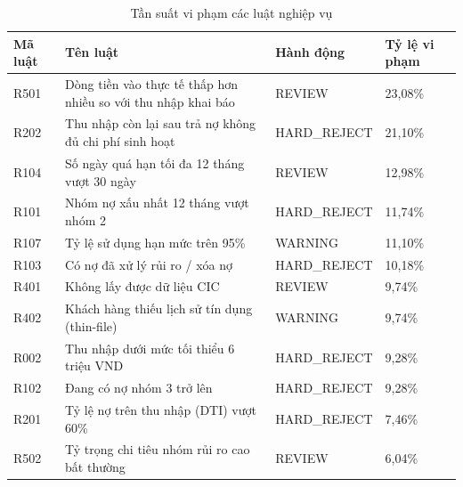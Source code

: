 \begin{table}[!htbp]
\centering
\caption{Tần suất vi phạm các luật nghiệp vụ}
\label{tab:rule-hits}
\small
\setlength{\tabcolsep}{5.0pt}
\begin{tabular}{@{}L{2.8cm}L{6.0cm}L{2.6cm}R{2.6cm}@{}}
\toprule
\textbf{Mã luật} & \textbf{Tên luật} & \textbf{Hành động} & \textbf{Tỷ lệ vi phạm} \\
\midrule
R501 & Dòng tiền vào thực tế thấp hơn nhiều so với thu nhập khai báo & REVIEW & 23,08\% \\
R202 & Thu nhập còn lại sau trả nợ không đủ chi phí sinh hoạt & HARD\_\allowbreak REJECT & 21,10\% \\
R104 & Số ngày quá hạn tối đa 12 tháng vượt 30 ngày & REVIEW & 12,98\% \\
R101 & Nhóm nợ xấu nhất 12 tháng vượt nhóm 2 & HARD\_\allowbreak REJECT & 11,74\% \\
R107 & Tỷ lệ sử dụng hạn mức trên 95\% & WARNING & 11,10\% \\
R103 & Có nợ đã xử lý rủi ro / xóa nợ & HARD\_\allowbreak REJECT & 10,18\% \\
R401 & Không lấy được dữ liệu CIC & REVIEW & 9,74\% \\
R402 & Khách hàng thiếu lịch sử tín dụng (thin-file) & WARNING & 9,74\% \\
R002 & Thu nhập dưới mức tối thiểu 6 triệu VND & HARD\_\allowbreak REJECT & 9,28\% \\
R102 & Đang có nợ nhóm 3 trở lên & HARD\_\allowbreak REJECT & 9,28\% \\
R201 & Tỷ lệ nợ trên thu nhập (DTI) vượt 60\% & HARD\_\allowbreak REJECT & 7,46\% \\
R502 & Tỷ trọng chi tiêu nhóm rủi ro cao bất thường & REVIEW & 6,04\% \\
\bottomrule
\end{tabular}
\end{table}

